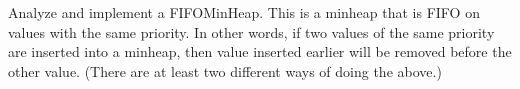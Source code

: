   Analyze and implement a FIFOMinHeap.
  This is a minheap that is FIFO on values with the
  same priority.
  In other words, if two values
  of the same priority
  are inserted into a minheap,
  then value inserted earlier will be
  removed before the other value.
  (There are at least two different ways of doing
  the above.)
